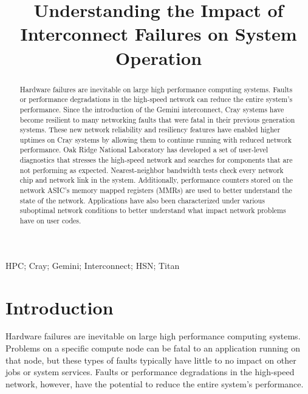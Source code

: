 \documentclass[10pt, conference, compsocconf]{IEEEtran}
\begin{document}
\title{Understanding the Impact of Interconnect Failures on System Operation}

\author{
}

\maketitle

\begin{abstract}

Hardware failures are inevitable on large high performance computing systems.
Faults or performance degradations in the high-speed network can reduce the
entire system's performance. Since the introduction of the Gemini interconnect,
Cray systems have become resilient to many networking faults that were fatal in
their previous generation systems. These new network reliability and resiliency
features have enabled higher uptimes on Cray systems by allowing them to
continue running with reduced network performance. Oak Ridge National
Laboratory has developed a set of user-level diagnostics that stresses the
high-speed network and searches for components that are not performing as
expected. Nearest-neighbor bandwidth tests check every network chip and network
link in the system. Additionally, performance counters stored on the network
ASIC's memory mapped registers (MMRs) are used to better understand the state
of the network. Applications have also been characterized under various
suboptimal network conditions to better understand what impact network problems
have on user codes.

\end{abstract}

\begin{IEEEkeywords}
HPC; Cray; Gemini; Interconnect; HSN; Titan
\end{IEEEkeywords}

\section{Introduction} 

Hardware failures are inevitable on large high performance computing systems.
Problems on a specific compute node can be fatal to an application running on
that node, but these types of faults typically have little to no impact on
other jobs or system services. Faults or performance degradations in the
high-speed network, however, have the potential to reduce the entire system's
performance.
\end{document}
